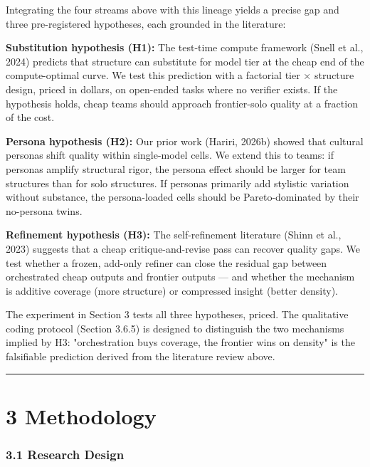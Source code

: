 \documentclass[11pt,a4paper]{article}
\begin{document}
Integrating the four streams above with this lineage yields a precise gap
and three pre-registered hypotheses, each grounded in the literature:

\textbf{Substitution hypothesis (H1):} The test-time compute framework (Snell et
al., 2024) predicts that structure can substitute for model tier at the
cheap end of the compute-optimal curve. We test this prediction with a
factorial tier × structure design, priced in dollars, on open-ended tasks
where no verifier exists. If the hypothesis holds, cheap teams should
approach frontier-solo quality at a fraction of the cost.

\textbf{Persona hypothesis (H2):} Our prior work (Hariri, 2026b) showed that
cultural personas shift quality within single-model cells. We extend this
to teams: if personas amplify structural rigor, the persona effect should be
larger for team structures than for solo structures. If personas primarily
add stylistic variation without substance, the persona-loaded cells should
be Pareto-dominated by their no-persona twins.

\textbf{Refinement hypothesis (H3):} The self-refinement literature (Shinn et
al., 2023) suggests that a cheap critique-and-revise pass can recover
quality gaps. We test whether a frozen, add-only refiner can close the
residual gap between orchestrated cheap outputs and frontier outputs — and
whether the mechanism is additive coverage (more structure) or compressed
insight (better density).

The experiment in Section 3 tests all three hypotheses, priced. The
qualitative coding protocol (Section 3.6.5) is designed to distinguish the
two mechanisms implied by H3: "orchestration buys coverage, the frontier
wins on density" is the falsifiable prediction derived from the literature
review above.

\hrule


\section{3 Methodology}

\subsubsection{3.1 Research Design}
\end{document}
